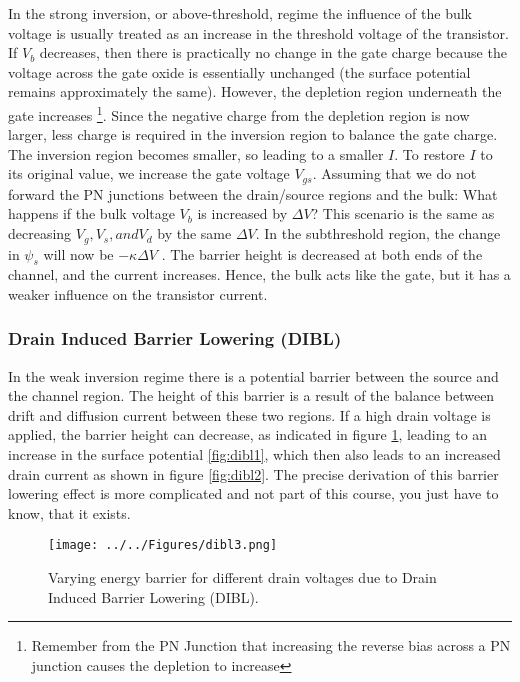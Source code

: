 In the strong inversion, or above-threshold, regime the influence of the
bulk voltage is usually treated as an increase in the threshold voltage of the
transistor. If $V_b$ decreases, then there is practically no change in the gate charge because the voltage across the gate oxide is essentially unchanged (the surface potential remains approximately the same). However, the depletion region underneath the gate increases \footnote{Remember from the PN Junction that increasing the reverse bias across a PN junction causes the depletion to increase}. Since the negative charge from the depletion region is now larger, less charge is required in the inversion region to balance the gate charge. The inversion region becomes smaller, so leading to a smaller $I$. To restore $I$ to its original value, we increase the gate voltage $V_{gs}$. Assuming that we do not forward the PN junctions between the drain/source regions and the bulk: What happens if the bulk voltage $V_b$ is increased by $\Delta V$?
This scenario is the same as decreasing $V_g , V_s, and V_d$ by the same $\Delta V$. In the subthreshold region, the change in $\psi_s$ will now be $-\kappa \Delta V$ . The barrier height is decreased at both ends of the channel, and the current increases. Hence, the bulk acts like the gate, but it has a weaker influence on the transistor current.

\subsubsection{Drain Induced Barrier Lowering (DIBL)}\label{sec:dibl}

In the weak inversion regime there is a potential barrier between the source and the channel region. The height of this barrier is a result of the balance between drift and diffusion current between these two regions. If a high drain voltage is applied, the barrier height can decrease, as indicated in figure \ref{fig:dibl3}, leading to an increase in the surface potential \ref{fig:dibl1}, which then also leads to an increased drain current as shown in figure \ref{fig:dibl2}. The precise derivation of this barrier lowering effect is more complicated and not part of this course, you just have to know, that it exists.\\

\begin{figure}[H]
    \centering
    \texttt{[image: ../../Figures/dibl3.png]}
    \caption{Varying energy barrier for different drain voltages due to Drain Induced Barrier Lowering (DIBL).}
    \label{fig:dibl3}
\end{figure}

